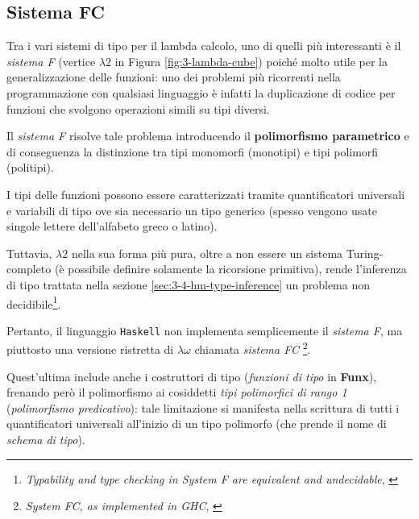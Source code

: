 \subsection{Sistema FC}
\label{sec:3-3-system-fc}

Tra i vari sistemi di tipo per il lambda calcolo, uno di quelli più interessanti è il \textit{sistema F}
(vertice $\lambda2$ in Figura \ref{fig:3-lambda-cube}) poiché molto utile per la generalizzazione delle funzioni:
uno dei problemi più ricorrenti nella programmazione con qualsiasi linguaggio è infatti la duplicazione di codice
per funzioni che svolgono operazioni simili su tipi diversi.


Il \textit{sistema F} risolve tale problema introducendo il \textbf{polimorfismo parametrico}
e di conseguenza la distinzione tra tipi monomorfi (monotipi) e tipi polimorfi (politipi).

\noindent I tipi delle funzioni possono essere caratterizzati tramite quantificatori universali e variabili di tipo
ove sia necessario un tipo generico (spesso vengono usate singole lettere dell'alfabeto greco o latino).


Tuttavia, $\lambda2$ nella sua forma più pura, oltre a non essere un sistema Turing-completo
(è possibile definire solamente la ricorsione primitiva), rende l'inferenza di tipo trattata nella sezione
\ref{sec:3-4-hm-type-inference} un problema non decidibile\footnote{\textit{Typability and type checking in System F
        are equivalent and undecidable}, \cite{TypabilityTypeCheckingSystemFUndecidable}}.

\noindent Pertanto, il linguaggio \texttt{Haskell} non implementa semplicemente il \textit{sistema F},
ma piuttosto una versione ristretta di $\lambda\omega$ chiamata \textit{sistema FC}%
\footnote{\textit{System FC, as implemented in GHC}, \cite{HaskellSystemFC}}.

\noindent Quest'ultima include anche i costruttori di tipo (\textit{funzioni di tipo} in \textbf{Funx}),
frenando però il polimorfismo ai cosiddetti \textit{tipi polimorfici di rango 1} (\textit{polimorfismo predicativo}):
tale limitazione si manifesta nella scrittura di tutti i quantificatori universali all'inizio di un tipo polimorfo
(che prende il nome di \textit{schema di tipo}).

